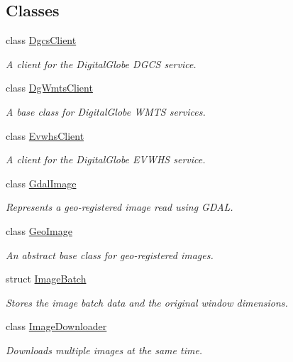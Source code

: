 \subsection*{Classes}
\begin{DoxyCompactItemize}
\item 
class \hyperlink{structdg_1_1deepcore_1_1imagery_1_1_dgcs_client}{Dgcs\+Client}
\begin{DoxyCompactList}\small\item\em A client for the Digital\+Globe D\+G\+CS service. \end{DoxyCompactList}\item 
class \hyperlink{classdg_1_1deepcore_1_1imagery_1_1_dg_wmts_client}{Dg\+Wmts\+Client}
\begin{DoxyCompactList}\small\item\em A base class for Digital\+Globe W\+M\+TS services. \end{DoxyCompactList}\item 
class \hyperlink{structdg_1_1deepcore_1_1imagery_1_1_evwhs_client}{Evwhs\+Client}
\begin{DoxyCompactList}\small\item\em A client for the Digital\+Globe E\+V\+W\+HS service. \end{DoxyCompactList}\item 
class \hyperlink{classdg_1_1deepcore_1_1imagery_1_1_gdal_image}{Gdal\+Image}
\begin{DoxyCompactList}\small\item\em Represents a geo-\/registered image read using G\+D\+AL. \end{DoxyCompactList}\item 
class \hyperlink{classdg_1_1deepcore_1_1imagery_1_1_geo_image}{Geo\+Image}
\begin{DoxyCompactList}\small\item\em An abstract base class for geo-\/registered images. \end{DoxyCompactList}\item 
struct \hyperlink{classdg_1_1deepcore_1_1imagery_1_1_image_batch}{Image\+Batch}
\begin{DoxyCompactList}\small\item\em Stores the image batch data and the original window dimensions. \end{DoxyCompactList}\item 
class \hyperlink{classdg_1_1deepcore_1_1imagery_1_1_image_downloader}{Image\+Downloader}
\begin{DoxyCompactList}\small\item\em Downloads multiple images at the same time. \end{DoxyCompactList}\item 

\end{DoxyCompactItemize}
